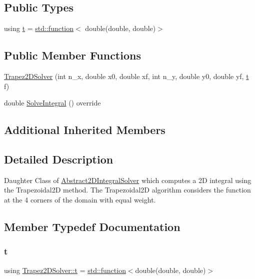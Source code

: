 \subsection*{Public Types}
\begin{DoxyCompactItemize}
\item 
using \hyperlink{class_trapez2_d_solver_a2af165a7995664482df24eec24a39ec3}{t} = \hyperlink{_tests_8cpp_a1c2dbde1ba7d93e381d4ccb9f603be16}{std\+::function}$<$ double(double, double)$>$
\end{DoxyCompactItemize}
\subsection*{Public Member Functions}
\begin{DoxyCompactItemize}
\item 
\hyperlink{class_trapez2_d_solver_a95b57f9279e40991610b4e91747d7e0d}{Trapez2\+D\+Solver} (int n\+\_\+x, double x0, double xf, int n\+\_\+y, double y0, double yf, \hyperlink{class_abstract2_d_integral_solver_ab660df32953c6b0f9f3a45a8720eaeb3}{t} f)
\item 
double \hyperlink{class_trapez2_d_solver_a88f724ff6fd2c566d54f5d0ccc500cb9}{Solve\+Integral} () override
\end{DoxyCompactItemize}
\subsection*{Additional Inherited Members}


\subsection{Detailed Description}
Daughter Class of \hyperlink{class_abstract2_d_integral_solver}{Abstract2\+D\+Integral\+Solver} which computes a 2D integral using the Trapezoidal2D method. The Trapezoidal2D algorithm considers the function at the 4 corners of the domain with equal weight. 

\subsection{Member Typedef Documentation}
\mbox{\label{class_trapez2_d_solver_a2af165a7995664482df24eec24a39ec3}} 
\subsubsection{\texorpdfstring{t}{t}}
{\footnotesize\ttfamily using \hyperlink{class_trapez2_d_solver_a2af165a7995664482df24eec24a39ec3}{Trapez2\+D\+Solver\+::t} =  \hyperlink{_tests_8cpp_a1c2dbde1ba7d93e381d4ccb9f603be16}{std\+::function}$<$double(double, double)$>$}

